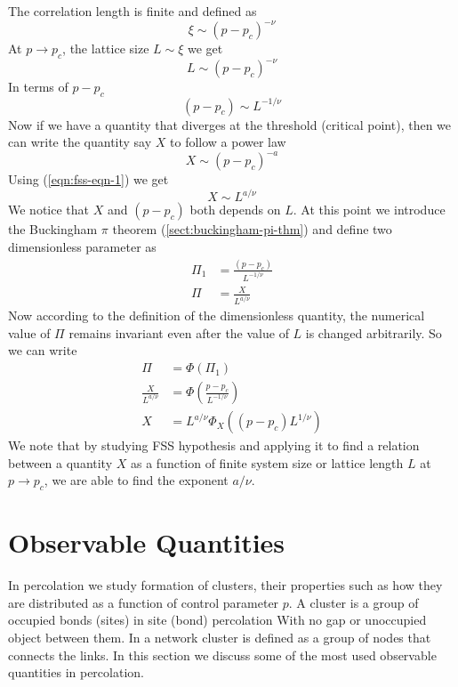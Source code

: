 	The correlation length is finite and defined as 
	\begin{equation}
		\xi \sim (p-p_c)^{-\nu}
	\end{equation}
	At $p \rightarrow p_c$, the lattice size $L\sim \xi$ we get
	\begin{equation}
		L \sim (p - p_c)^{-\nu}
	\end{equation}
	In terms of $p-p_c$
	\begin{equation}
		(p-p_c) \sim L^{-1/\nu}
		\label{eqn:fss-eqn-1}
	\end{equation}
	Now if we have a quantity that diverges at the threshold (critical point), then we can write the quantity say $X$ to follow a power law
	\begin{equation}
		X \sim (p-p_c)^{-a}
	\end{equation}
	Using (\ref{eqn:fss-eqn-1}) we get
	\begin{equation}
		X \sim L^{a/\nu}
	\end{equation}
	We notice that $X$ and $(p-p_c)$ both depends on $L$. At this point we introduce the Buckingham $\pi$ theorem (\ref{sect:buckingham-pi-thm}) and define two dimensionless parameter as
	\begin{align}
		\Pi_1 &= \frac{(p-p_c)}{L^{-1/\nu}} \\
		\Pi   &= \frac{X}{L^{a/\nu}}
	\end{align}
	Now according to the definition of the dimensionless quantity, the numerical value of $\Pi$ remains invariant even after the value of $L$ is changed arbitrarily. So we can write
	\begin{align}
		\Pi &= \Phi(\Pi_1) \\
		\frac{X}{L^{a/\nu}} &= \Phi\left(\frac{p-p_c}{L^{-1/\nu}}\right) \label{eqn:fss-in-action-collapse} \\
		X &= L^{a/\nu} \Phi_X \left((p-p_c)L^{1/\nu}\right)
		\label{eqn:fss-in-action}
	\end{align}
	We note that by studying FSS hypothesis and applying it to find a relation between a quantity $X$ as a function of finite system size or lattice length $L$ at $p \rightarrow p_c$, we are able to find the exponent $a/\nu$.

	
\section{Observable Quantities}
	In percolation we study formation of clusters, their properties such as how they are distributed as a function of control parameter $p$. A cluster is a group of occupied bonds (sites) in site (bond) percolation \cite{redefinition-of-site-percolation} With no gap or unoccupied object between them. In a network cluster is defined as a group of nodes that connects the links. In this section we discuss some of the most used observable quantities in percolation.
	
